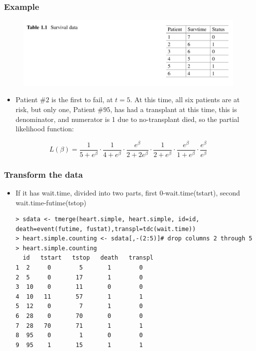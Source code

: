 \documentclass{beamer}
\begin{document}
\pagebreak
\begin{frame}
\frametitle{Example}
\begin{figure}
\includegraphics[scale = .3]{001.png}
\end{figure}
\begin{itemize}
\item Patient $\#2$ is the first to fail, at $t=5$. At this time, all six patients are at risk, but only one, Patient $\#95$, has had a transplant at this time, this is denominator, and numerator is 1 due to no-transplant died, so the partial likelihood function:
\end{itemize}
\begin{equation}
L(\beta) = \frac{1}{5+e^{\beta}}\cdot \frac{1}{4+e^{\beta}}\cdot  \frac{e^{\beta}}{2+2e^{\beta}}\cdot \frac{1}{2+e^{\beta}}\cdot \frac{e^{\beta}}{1+e^{\beta}}\cdot \frac{e^{\beta}}{e^{\beta}}
\end{equation}
\end{frame}

\pagebreak
\begin{frame}[fragile]
\frametitle{Transform the data}
\begin{itemize}
\item If it has wait.time, divided into two parts, first 0-wait.time(tstart), second wait.time-futime(tstop)
\begin{Verbatim}
> sdata <- tmerge(heart.simple, heart.simple, id=id, 
death=event(futime, fustat),transpl=tdc(wait.time)) 
> heart.simple.counting <- sdata[,-(2:5)]# drop columns 2 through 5
> heart.simple.counting
  id   tstart   tstop   death   transpl 
1  2     0        5       1        0 
2  5     0       17       1        0 
3  10    0       11       0        0 
4  10   11       57       1        1 
5  12    0        7       1        0 
6  28    0       70       0        0 
7  28   70       71       1        1 
8  95    0        1       0        0 
9  95    1       15       1        1 
\end{Verbatim}
\end{itemize}
\end{frame}
\end{document}
